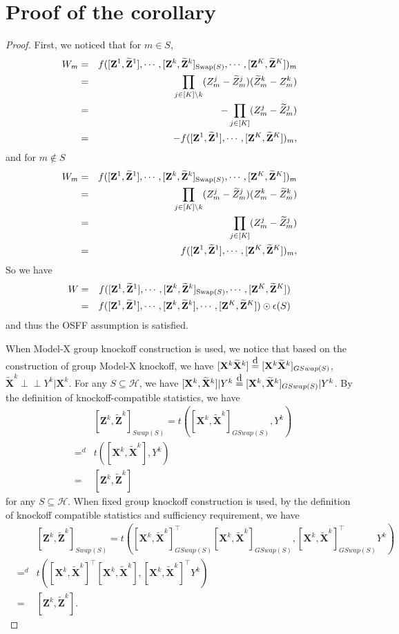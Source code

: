 \documentclass[11pt]{article}
\theoremstyle{plain}
\theoremstyle{definition}
\theoremstyle{remark}
\def\Z{\mathbf{Z}}
\newcommand\eqd{\stackrel{\mathclap{\normalfont\mbox{d}}}{=}}
\newcommand{\X}{\mathbf{X}}
\newcommand{\0}{\mathbf{0}}
\newcommand{\indep}{\perp \!\!\! \perp}
\begin{document}
\section{Proof of the corollary}
\begin{proof}
First, we noticed that for $m\in S$,
\begin{eqnarray*}
W_m&=&f([\Z^1,\widetilde{\Z}^1],\cdots,[\Z^k,\widetilde{\Z}^k]_{\textnormal{Swap}(S)},\cdots,[\Z^K,\widetilde{\Z}^K])_m\\
&=&\prod_{j\in [K]\backslash k} (Z^j_m-\widetilde{Z}^j_m)(\widetilde{Z}_m^k-Z_m^k)\\
&=&-\prod_{j\in [K]} (Z^j_m-\widetilde{Z}^j_m)\\
&=&-f([\Z^1,\widetilde{\Z}^1],\cdots,[\Z^K,\widetilde{\Z}^K])_m,
\end{eqnarray*}
and for $m\notin S$
\begin{eqnarray*}
W_m&=&f([\Z^1,\widetilde{\Z}^1],\cdots,[\Z^k,\widetilde{\Z}^k]_{\textnormal{Swap}(S)},\cdots,[\Z^K,\widetilde{\Z}^K])_m\\
&=&\prod_{j\in [K]\backslash k} (Z^j_m-\widetilde{Z}^j_m)(Z_m^k-\widetilde{Z}_m^k)\\
&=&\prod_{j\in [K]} (Z^j_m-\widetilde{Z}^j_m)\\
&=&f([\Z^1,\widetilde{\Z}^1],\cdots,[\Z^K,\widetilde{\Z}^K])_m,
\end{eqnarray*}
So we have
\begin{eqnarray*}
W&=&f([\Z^1,\widetilde{\Z}^1],\cdots,[\Z^k,\widetilde{\Z}^k]_{\textnormal{Swap}(S)},\cdots,[\Z^K,\widetilde{\Z}^K])\\
&=&f([\Z^1,\widetilde{\Z}^1],\cdots,[\Z^k,\widetilde{\Z}^k],\cdots,[\Z^K,\widetilde{\Z}^K])\odot \epsilon(S)
\end{eqnarray*}
and thus the OSFF assumption is satisfied. 

When Model-X group knockoff construction is used, we notice that based on the construction of group Model-X knockoff, we have $[\X^k \widetilde{\X}^k]\eqd [\X^k \widetilde{\X}^k]_{GSwap(S)}$, $\widetilde{\X}^k\indep Y^k | \X^k$. For any $S\subseteq\mathcal{H}$, we have $[\X^k, \widetilde{\X}^k]|Y^k\eqd [\X^k, \widetilde{\X}^k]_{GSwap(S)}|Y^k$. By the definition of knockoff-compatible statistics, we have 
\begin{eqnarray*}
&&[\Z^k,\widetilde{\Z}^k]_{Swap(S)}=t([\X^k, \widetilde{\X}^k]_{GSwap(S)}, Y^k)\\
&=^d&t([\X^k, \widetilde{\X}^k], Y^k)\\
&=&[\Z^k,\widetilde{\Z}^k]
\end{eqnarray*}
 for any $S\subseteq\mathcal{H}$. When fixed group knockoff construction is used, by the definition of knockoff compatible statistics and sufficiency requirement, we have
 \begin{eqnarray*}
&&[\Z^k,\widetilde{\Z}^k]_{Swap(S)}=t([\X^k, \widetilde{\X}^k]^\top_{GSwap(S)}[\X^k, \widetilde{\X}^k]_{GSwap(S)}, [\X^k, \widetilde{\X}^k]_{GSwap(S)}^\top Y^k)\\
&=^d&t([\X^k, \widetilde{\X}^k]^\top[\X^k, \widetilde{\X}^k], [\X^k, \widetilde{\X}^k]^\top Y^k)\\
&=&[\Z^k,\widetilde{\Z}^k].
\end{eqnarray*}


\end{proof}
\end{document}
